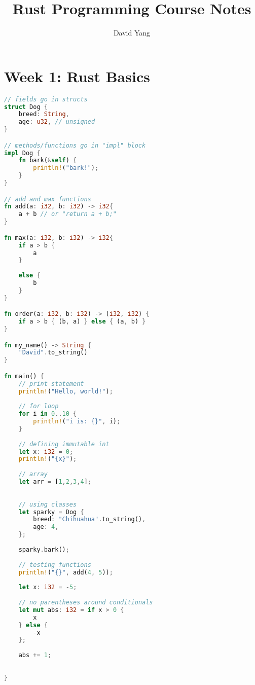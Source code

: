 \documentclass[12pt]{amsart}
\begin{document}
\title[short paper title]{Rust Programming Course Notes}
\author{David Yang}
\maketitle

\section{Week 1: Rust Basics}

\begin{lstlisting}[language = Rust]
// fields go in structs
struct Dog {
    breed: String,
    age: u32, // unsigned
}

// methods/functions go in "impl" block
impl Dog {
    fn bark(&self) {
        println!("bark!");
    }
}

// add and max functions
fn add(a: i32, b: i32) -> i32{
    a + b // or "return a + b;"
}

fn max(a: i32, b: i32) -> i32{
    if a > b {
        a
    }
    
    else {
        b
    }
}

fn order(a: i32, b: i32) -> (i32, i32) {
    if a > b { (b, a) } else { (a, b) }
}

fn my_name() -> String {
    "David".to_string()
}

fn main() {
    // print statement
    println!("Hello, world!");
    
    // for loop
    for i in 0..10 {
        println!("i is: {}", i);
    }
    
    // defining immutable int 
    let x: i32 = 0;
    println!("{x}");
    
    // array 
    let arr = [1,2,3,4];
    
    
    // using classes
    let sparky = Dog {
        breed: "Chihuahua".to_string(),
        age: 4,
    };
    
    sparky.bark();
    
    // testing functions
    println!("{}", add(4, 5));
    
    let x: i32 = -5;
    
    // no parentheses around conditionals
    let mut abs: i32 = if x > 0 {
        x
    } else {
        -x
    };
    
    abs += 1;
    
    
}
\end{lstlisting}
\end{document}
